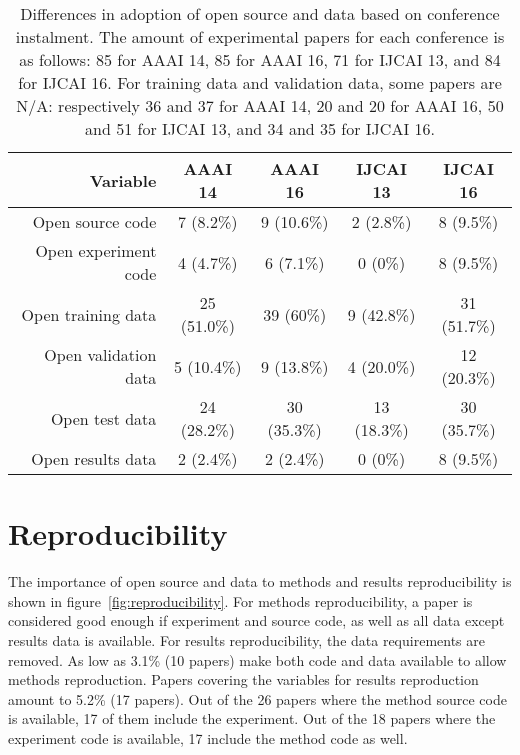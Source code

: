\begin{table}[!h]
\begin{center}
    \begin{tabular}{ r|cccc }
    \textbf{Variable} & \textbf{AAAI 14} & \textbf{AAAI 16} & \textbf{IJCAI 13} & \textbf{IJCAI 16}\\ \hline
    Open source code & 7 (8.2\%) & 9 (10.6\%) & 2 (2.8\%) & 8 (9.5\%) \\
    Open experiment code & 4 (4.7\%) & 6 (7.1\%) & 0 (0\%) & 8 (9.5\%) \\
    Open training data & 25 (51.0\%) & 39 (60\%) & 9 (42.8\%) & 31 (51.7\%) \\
    Open validation data & 5 (10.4\%) & 9 (13.8\%) & 4 (20.0\%) & 12 (20.3\%) \\
    Open test data & 24 (28.2\%) & 30 (35.3\%) & 13 (18.3\%) & 30 (35.7\%) \\
    Open results data & 2 (2.4\%) & 2 (2.4\%) & 0 (0\%) & 8 (9.5\%) \\
    \end{tabular}
\end{center}
\caption[Open source and data compared to conference instalment.]{Differences in adoption of open source and data based on conference instalment. The amount of experimental papers for each conference is as follows: 85 for AAAI 14, 85 for AAAI 16, 71 for IJCAI 13, and 84 for IJCAI 16. For training data and validation data, some papers are N/A: respectively 36 and 37 for AAAI 14, 20 and 20 for AAAI 16, 50 and 51 for IJCAI 13, and 34 and 35 for IJCAI 16.}
\label{tab:pattern-conferences}
\end{table}

\section{Reproducibility}
The importance of open source and data to methods and results reproducibility is shown in figure~\ref{fig:reproducibility}. For methods reproducibility, a paper is considered good enough if experiment and source code, as well as all data except results data is available. For results reproducibility, the data requirements are removed. As low as 3.1\% (10 papers) make both code and data available to allow methods reproduction. Papers covering the variables for results reproduction amount to 5.2\% (17 papers). Out of the 26 papers where the method source code is available, 17 of them include the experiment. Out of the 18 papers where the experiment code is available, 17 include the method code as well.


